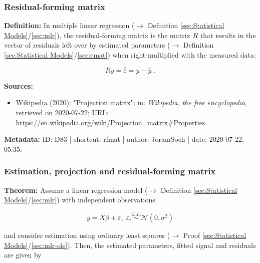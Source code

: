 \documentclass[a4paper,12pt,twoside]{book}
\begin{document}
\subsubsection[\textit{Residual-forming matrix}]{Residual-forming matrix} \label{sec:rfmat}
\setcounter{equation}{0}

\textbf{Definition:} In multiple linear regression ($\rightarrow$ Definition \ref{sec:Statistical Models}/\ref{sec:mlr}), the residual-forming matrix is the matrix $R$ that results in the vector of residuals left over by estimated parameters ($\rightarrow$ Definition \ref{sec:Statistical Models}/\ref{sec:emat}) when right-multiplied with the measured data:

\begin{equation} \label{eq:rfmat-pm}
Ry = \hat{\varepsilon} = y - \hat{y} \; .
\end{equation}


\vspace{1em}
\textbf{Sources:}
\begin{itemize}
\item Wikipedia (2020): "Projection matrix"; in: \textit{Wikipedia, the free encyclopedia}, retrieved on 2020-07-22; URL: \url{https://en.wikipedia.org/wiki/Projection_matrix#Properties}.
\end{itemize}


\vspace{1em}
\textbf{Metadata:} ID: D83 | shortcut: rfmat | author: JoramSoch | date: 2020-07-22, 05:35.
\vspace{1em}



\subsubsection[\textbf{Estimation, projection and residual-forming matrix}]{Estimation, projection and residual-forming matrix} \label{sec:mlr-mat}
\setcounter{equation}{0}

\textbf{Theorem:} Assume a linear regression model ($\rightarrow$ Definition \ref{sec:Statistical Models}/\ref{sec:mlr}) with independent observations

\begin{equation} \label{eq:mlr-mat-mlr}
y = X\beta + \varepsilon, \; \varepsilon_i \overset{\mathrm{i.i.d.}}{\sim} \mathcal{N}(0, \sigma^2)
\end{equation}

and consider estimation using ordinary least squares ($\rightarrow$ Proof \ref{sec:Statistical Models}/\ref{sec:mlr-ols}). Then, the estimated parameters, fitted signal and residuals are given by
\end{document}
